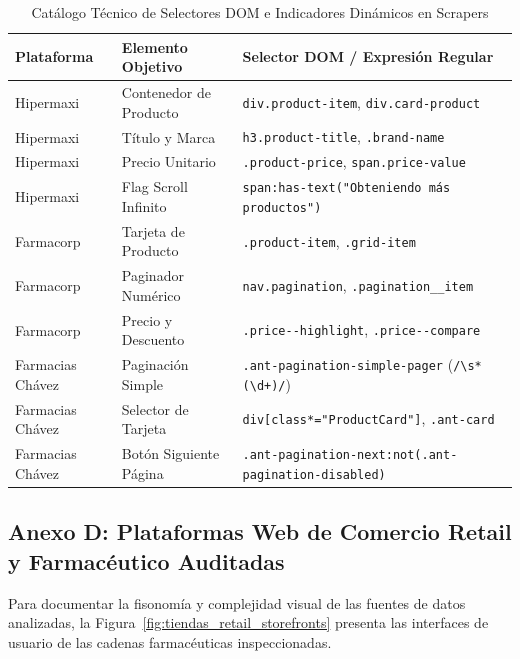 \begin{table}[htbp]
    \centering
    \small
    \caption{Catálogo Técnico de Selectores DOM e Indicadores Dinámicos en Scrapers}
    \label{tab:anexo_selectores}
    \begin{tabularx}{\linewidth}{>{\raggedright\arraybackslash}p{3.3cm} >{\raggedright\arraybackslash}p{4.2cm} L}
        \toprule
        \textbf{Plataforma} & \textbf{Elemento Objetivo} & \textbf{Selector DOM / Expresión Regular} \\
        \midrule
        Hipermaxi & Contenedor de Producto & \nolinkurl{div.product-item}, \nolinkurl{div.card-product} \\
        Hipermaxi & Título y Marca & \nolinkurl{h3.product-title}, \nolinkurl{.brand-name} \\
        Hipermaxi & Precio Unitario & \nolinkurl{.product-price}, \nolinkurl{span.price-value} \\
        Hipermaxi & Flag Scroll Infinito & \texttt{span:has-text("Obteniendo más productos")} \\
        Farmacorp & Tarjeta de Producto & \nolinkurl{.product-item}, \nolinkurl{.grid-item} \\
        Farmacorp & Paginador Numérico & \nolinkurl{nav.pagination}, \nolinkurl{.pagination__item} \\
        Farmacorp & Precio y Descuento & \nolinkurl{.price--highlight}, \nolinkurl{.price--compare} \\
        Farmacias Chávez & Paginación Simple & \nolinkurl{.ant-pagination-simple-pager} (\texttt{/\textbackslash s*(\textbackslash d+)/}) \\
        Farmacias Chávez & Selector de Tarjeta & \nolinkurl{div[class*="ProductCard"]}, \nolinkurl{.ant-card} \\
        Farmacias Chávez & Botón Siguiente Página & \nolinkurl{.ant-pagination-next:not(.ant-pagination-disabled)} \\
        \bottomrule
    \end{tabularx}
\end{table}

\clearpage
\subsection{Anexo D: Plataformas Web de Comercio Retail y Farmacéutico Auditadas}
Para documentar la fisonomía y complejidad visual de las fuentes de datos analizadas, la Figura~\ref{fig:tiendas_retail_storefronts} presenta las interfaces de usuario de las cadenas farmacéuticas inspeccionadas.

